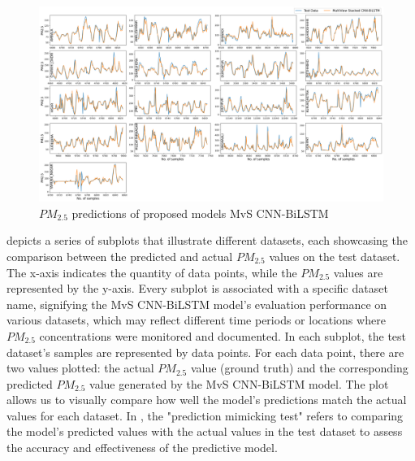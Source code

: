 \documentclass[a4paper, fleqn]{cas-sc}
\theoremstyle{definition}
\theoremstyle{remark}
\begin{document}
\begin{figure}[h!]
	\centering
		\includegraphics[scale=0.29]{act vs pri}
	  \caption{$PM_{2.5}$ predictions of proposed models MvS CNN-BiLSTM}\label{ACt_vs_Pred}
\end{figure}
 depicts a series of subplots that illustrate different datasets,  each showcasing the comparison between the predicted and actual $PM_{2.5}$ values on the test dataset. The x-axis indicates the quantity of data points,  while the $PM_{2.5}$ values are represented by the y-axis. Every subplot is associated with a specific dataset name,  signifying the MvS CNN-BiLSTM model's evaluation performance on various datasets,  which may reflect different time periods or locations where $PM_{2.5}$ concentrations were monitored and documented. In each subplot,  the test dataset's samples are represented by data points. For each data point,  there are two values plotted:  the actual $PM_{2.5}$ value (ground truth) and the corresponding predicted $PM_{2.5}$ value generated by the MvS CNN-BiLSTM model. The plot allows us to visually compare how well the model's predictions match the actual values for each dataset. In , the "prediction mimicking test" refers to comparing the model's predicted values with the actual values in the test dataset to assess the accuracy and effectiveness of the predictive model.
\end{document}
